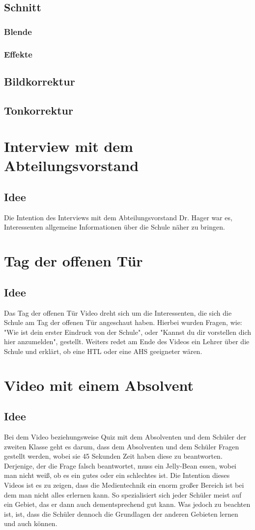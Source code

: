 \subsection{Schnitt}
\subsubsection{Blende}
\subsubsection{Effekte}
\subsection{Bildkorrektur}
\subsection{Tonkorrektur}

\section{Interview mit dem Abteilungsvorstand}
\subsection{Idee}
Die Intention des Interviews mit dem Abteilungsvorstand Dr. Hager war es, Interessenten allgemeine Informationen über die Schule näher zu bringen. 
\section{Tag der offenen Tür}
\subsection{Idee}
Das Tag der offenen Tür Video dreht sich um die Interessenten, die sich die Schule am Tag der offenen Tür angeschaut haben. Hierbei wurden Fragen, wie: "Wie ist dein erster Eindruck von der Schule", oder "Kannst du dir vorstellen dich hier anzumelden", gestellt. Weiters redet am Ende des Videos ein Lehrer über die Schule und erklärt, ob eine HTL oder eine AHS geeigneter wären.
\section{Video mit einem Absolvent}
\subsection{Idee}
Bei dem Video beziehungsweise Quiz mit dem Absolventen und dem Schüler der zweiten Klasse geht es darum, dass dem Absolventen und dem Schüler Fragen gestellt werden, wobei sie 45 Sekunden Zeit haben diese zu beantworten. Derjenige, der die Frage falsch beantwortet, muss ein Jelly-Bean essen, wobei man nicht weiß, ob es ein gutes oder ein schlechtes ist. Die Intention dieses Videos ist es zu zeigen, dass die Medientechnik ein enorm großer Bereich ist bei dem man nicht alles erlernen kann. So spezialisiert sich jeder Schüler meist auf ein Gebiet, das er dann auch dementsprechend gut kann. Was jedoch zu beachten ist, ist, dass die Schüler dennoch die Grundlagen der anderen Gebieten lernen und auch können.
